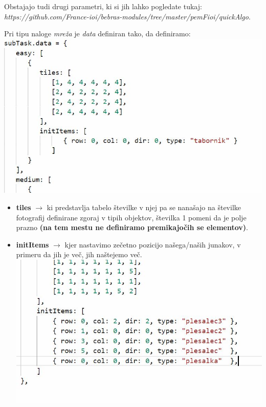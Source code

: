 \documentclass[11pt]{article} %
\begin{document}
Obstajajo tudi drugi parametri, ki si jih lahko pogledate tukaj:\\
\textit{https://github.com/France-ioi/bebras-modules/tree/master/pemFioi/quickAlgo}.

Pri tipu naloge \textit{mreža} je \textit{data} definiran tako, da definiramo:\\
\includegraphics[scale=0.5]{mreza_data}\\
\begin{itemize}
\item \textbf{tiles}  $\rightarrow$ ki predstavlja tabelo številke v njej pa se nanašajo na številke fotografij definirane zgoraj v tipih objektov, številka 1 pomeni da je polje prazno \textbf{(na tem mestu ne definiramo premikajočih se elementov)}.
\item \textbf{initItems}  $\rightarrow$ kjer nastavimo zečetno pozicijo našega/naših junakov, v primeru da jih je več, jih naštejemo več.\\
\includegraphics[scale=0.5]{mreza_vec_elementov}
\end{itemize}
\end{document}
